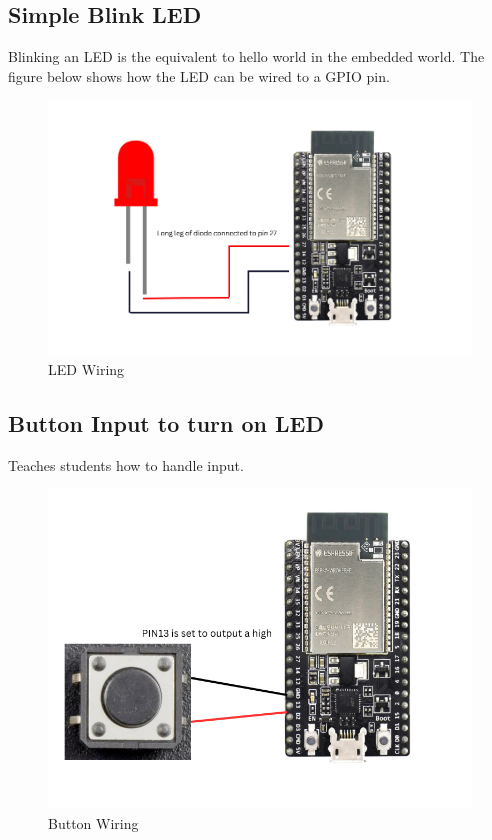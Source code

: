 \documentclass[11pt]{article}
\begin{document}
\subsection*{Simple Blink LED}
Blinking an LED is the equivalent to hello world in the embedded world. The figure below shows how the LED can be wired to a GPIO pin. 
\begin{figure}[H]
  \centering
  \includegraphics[scale=0.3]{led.png}
  \caption{LED Wiring}
  \label{fig:led}
\end{figure}
\subsection*{Button Input to turn on LED}
Teaches students how to handle input.
\begin{figure}[H]
  \centering
  \includegraphics[scale = 0.3]{button.png}
  \caption{Button Wiring}
  \label{fig:button}
\end{figure}
\end{document}
